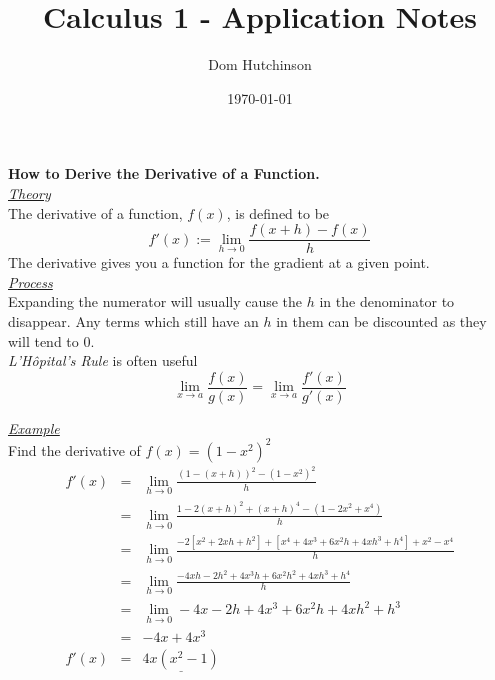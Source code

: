 \documentclass[11pt,a4paper]{article}
\begin{document}
\pagestyle{fancy}
\setlength\parindent{0pt}
\allowdisplaybreaks

\renewcommand{\headrulewidth}{0pt}
\newcommand{\vect}[1]{\boldsymbol{#1}}
\newcommand{\dotprod}[0]{\boldsymbol{\cdot}}
\newcommand{\real}[0]{\mathbb{R}}
\newcommand{\field}[0]{\mathbb{F}}
\newcommand{\naturals}[0]{\mathbb{N}}
\newcommand{\complex}[0]{\mathbb{C}}
\newcommand{\innerproduct}[2]{\langle #1, #2 \rangle}
\newcommand{\subtitle}[1]{\underline{\textit{#1}}\\}
\newcommand{\cosec}[0]{\mathrm{cosec}}

\title{Calculus 1 - Application Notes}
\author{Dom Hutchinson}
\date{\today}
\maketitle

\fancyhead[R]{\today}

\textbf{How to Derive the Derivative of a Function.}\\

\subtitle{Theory}
The derivative of a function, $f(x)$, is defined to be
$$f'(x) := \lim_{h \to 0}\frac{f(x+h)-f(x)}{h}$$
The derivative gives you a function for the gradient at a given point.\\

\subtitle{Process}
Expanding the numerator will usually cause the $h$ in the denominator to disappear. Any terms which still have an $h$ in them can be discounted as they will tend to $0$.\\
\textit{L'H\^opital's Rule} is often useful
$$\lim_{x\to a} \frac{f(x)}{g(x)} = \lim_{x \to a}\frac{f'(x)}{g'(x)}$$

\subtitle{Example}
Find the derivative of $f(x) = (1-x^2)^2$
\[\begin{array}{rcl}
f'(x) &=& \lim_{h\to 0} \displaystyle{\frac{(1-(x+h))^2 - (1-x^2)^2}{h}}\\
&=& \lim_{h \to 0} \displaystyle{\frac{1 - 2(x+h)^2 + (x+h)^4 -(1-2x^2 + x^4)}{h}}\\
&=& \lim_{h \to 0} \displaystyle{\frac{-2\left[ x^2 + 2xh +h^2\right] +\left[x^4 + 4x^3 + 6x^2h + 4xh^3 +h^4\right] + x^2 - x^4}{h}}\\
&=& \lim_{h \to 0} \displaystyle{\frac{-4xh -2h^2 +4x^3h + 6x^2h^2 +4xh^3 + h^4}{h}}\\
&=& \lim_{h \to 0} -4x-2h+4x^3+6x^2h+4xh^2+h^3\\
&=&-4x+4x^3\\
f'(x) &=& \underline{4x\left(x^2 - 1\right)}
\end{array}\]
\end{document}
